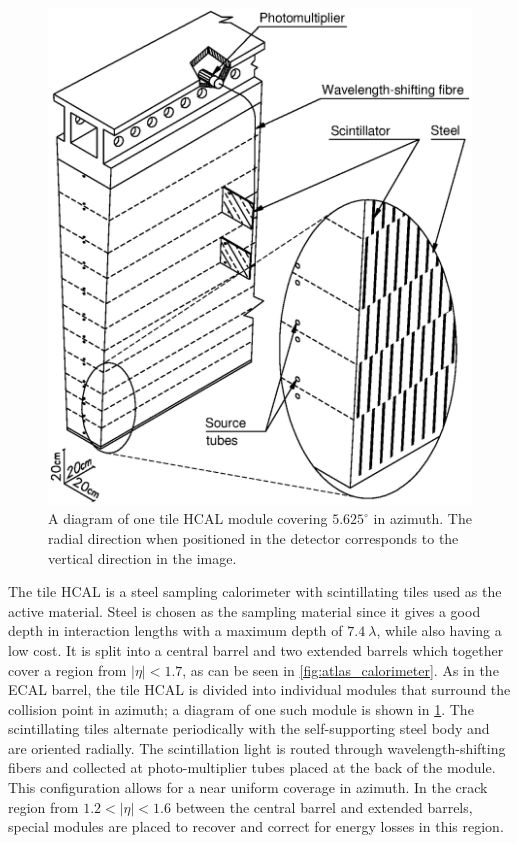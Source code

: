 \begin{figure}[ht]
\centering
\includegraphics[width=.6\textwidth]{figures/atlas/hcal_module.eps}
\caption{ A diagram of one tile HCAL module 
covering $5.625^{\circ}$ in azimuth. The radial direction when 
positioned in the detector corresponds to the vertical direction in the
image.}
\label{fig:atlas_hcal_module}
\end{figure}


The tile HCAL is a steel sampling calorimeter with scintillating tiles used as the 
active material.
Steel is chosen as the sampling material since it gives a good
depth in interaction lengths  with a maximum depth
of $7.4~\lambda$, while also having a low cost.
It is split into a central barrel and two extended barrels 
which together cover a 
region from $|\eta|< 1.7$, as can be seen in \fig\ref{fig:atlas_calorimeter}.
As in the ECAL barrel, the tile HCAL is divided into individual modules
that surround the collision point in azimuth; a diagram of one such
module is shown in \fig\ref{fig:atlas_hcal_module}.
The scintillating tiles alternate periodically with the self-supporting
steel body and are oriented radially. 
The scintillation
light is routed through wavelength-shifting fibers and collected
at photo-multiplier tubes placed at the back of the module.
This configuration allows for a near uniform coverage in azimuth.  
In the crack region from $1.2 < |\eta| < 1.6$ between the central barrel 
and extended barrels, special modules are placed to recover and correct
for energy losses in this region.

